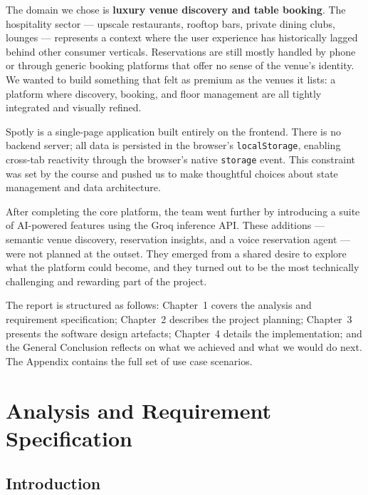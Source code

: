 \documentclass[12pt,a4paper,oneside]{report}
\begin{document}
The domain we chose is \textbf{luxury venue discovery and table booking}. The
hospitality sector --- upscale restaurants, rooftop bars, private dining clubs,
lounges --- represents a context where the user experience has historically
lagged behind other consumer verticals. Reservations are still mostly handled
by phone or through generic booking platforms that offer no sense of the
venue's identity. We wanted to build something that felt as premium as the
venues it lists: a platform where discovery, booking, and floor management are
all tightly integrated and visually refined.

Spotly is a single-page application built entirely on the frontend. There is no
backend server; all data is persisted in the browser's \texttt{localStorage},
enabling cross-tab reactivity through the browser's native \texttt{storage}
event. This constraint was set by the course and pushed us to make thoughtful
choices about state management and data architecture.

After completing the core platform, the team went further by introducing a suite
of AI-powered features using the Groq inference API. These additions --- semantic
venue discovery, reservation insights, and a voice reservation agent --- were not
planned at the outset. They emerged from a shared desire to explore what the
platform could become, and they turned out to be the most technically challenging
and rewarding part of the project.

The report is structured as follows: Chapter~1 covers the analysis and
requirement specification; Chapter~2 describes the project planning;
Chapter~3 presents the software design artefacts; Chapter~4 details the
implementation; and the General Conclusion reflects on what we achieved and
what we would do next. The Appendix contains the full set of use case scenarios.


\chapter{Analysis and Requirement Specification}

\section{Introduction}
\end{document}
